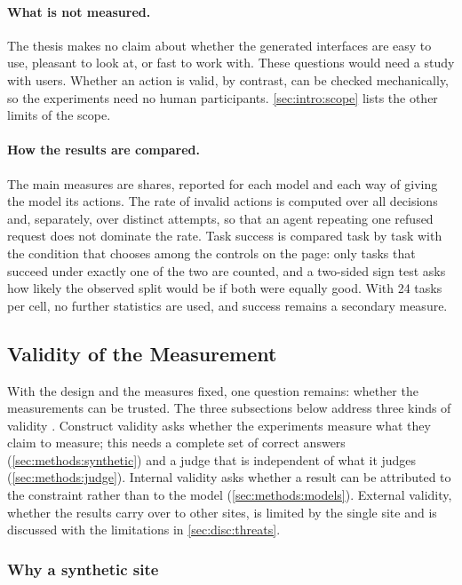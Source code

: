 \paragraph{What is not measured.}
The thesis makes no claim about whether the generated interfaces are easy to use, pleasant to look at, or fast to work with.
These questions would need a study with users.
Whether an action is valid, by contrast, can be checked mechanically, so the experiments need no human participants.
\autoref{sec:intro:scope} lists the other limits of the scope.

\paragraph{How the results are compared.}
The main measures are shares, reported for each model and each way of giving the model its actions.
The rate of invalid actions is computed over all decisions and, separately, over distinct attempts, so that an agent repeating one refused request does not dominate the rate.
Task success is compared task by task with the condition that chooses among the controls on the page: only tasks that succeed under exactly one of the two are counted, and a two-sided sign test asks how likely the observed split would be if both were equally good.
With 24 tasks per cell, no further statistics are used, and success remains a secondary measure.

\subsection{Validity of the Measurement}\label{sec:methods:validity}

With the design and the measures fixed, one question remains: whether the measurements can be trusted.
The three subsections below address three kinds of validity \cite{wohlin2012experimentation}.
Construct validity asks whether the experiments measure what they claim to measure; this needs a complete set of correct answers (\autoref{sec:methods:synthetic}) and a judge that is independent of what it judges (\autoref{sec:methods:judge}).
Internal validity asks whether a result can be attributed to the constraint rather than to the model (\autoref{sec:methods:models}).
External validity, whether the results carry over to other sites, is limited by the single site and is discussed with the limitations in \autoref{sec:disc:threats}.

\subsubsection{Why a synthetic site}\label{sec:methods:synthetic}

